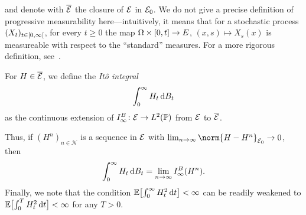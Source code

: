 and denote with \( \overline{\mathcal{E}} \) the closure of \( \mathcal{E} \) in \( \mathcal{E}_{\num{0}} \).
We do not give a precise definition of progressive measurability here---intuitively, it means that for a stochastic process \( \StochasticProcess{\rinterval{\num{0}}{\infty}} \), for every \( t \geq \num{0} \) the map \( \Omega \times \interval{\num{0}}{t} \to E \), \( (x, s) \mapsto X_s(x) \) is measureable with respect to the \enquote{standard} measures.
For a more rigorous definition, see~\cite[definition 25.5 (ii)]{Klenke2014}.
\begin{definition}%
	\label{def:ito integral}
	For \( H \in \overline{\mathcal{E}} \), we define the \emph{Itô integral}
	\begin{equation}
		\int_{\num{0}}^\infty H_t\,\mathrm{d}B_t
	\end{equation}
	as the continuous extension of \( I_\infty^B \colon \mathcal{E} \to L^{\num{2}}(\mathbb{P}) \) from \( \mathcal{E} \) to \( \overline{\mathcal{E}} \).
\end{definition}
Thus, if \( (H^n)_{n\in\mathcal{N}} \) is a sequence in \( \mathcal{E} \) with \( \lim_{n\to\infty} \norm{H-H^n}_{\PredictableSimpleProcesses_{\num{0}}} \to \num{0} \), then
\begin{equation}
	\int_{\num{0}}^\infty H_t\,\mathrm{d}B_t = \lim_{n\to\infty}I_\infty^B(H^n).
\end{equation}
Finally, we note that the condition \( \mathbb{E}\bigl[\int_{\num{0}}^\infty H^{\num{2}}_t\,\mathrm{d}t\bigr] < \infty \) can be readily weakened to \( \mathbb{E}\bigl[\int_{\num{0}}^T H^{\num{2}}_t\,\mathrm{d}t\bigr] < \infty \) for any \( T > \num{0} \).
